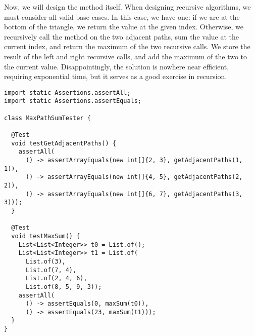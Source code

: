 \begin{figure}[ht!]
  \centering
{}
\end{figure}

Now, we will design the method itself. 
When designing recursive algorithms, we must consider all valid base cases.
In this case, we have one: if we are at the bottom of the triangle, we return the value at the given index.
Otherwise, we recursively call the method on the two adjacent paths, sum the value at the current index, and return the maximum of the two recursive calls.
We store the result of the left and right recursive calls, and add the maximum of the two to the current value.
Disappointingly, the solution is nowhere near efficient, requiring exponential time, but it serves as a good exercise in recursion.

\begin{lstlisting}[language=MyJava]
import static Assertions.assertAll;
import static Assertions.assertEquals;

class MaxPathSumTester {

  @Test
  void testGetAdjacentPaths() {
    assertAll(
      () -> assertArrayEquals(new int[]{2, 3}, getAdjacentPaths(1, 1)),
      () -> assertArrayEquals(new int[]{4, 5}, getAdjacentPaths(2, 2)),
      () -> assertArrayEquals(new int[]{6, 7}, getAdjacentPaths(3, 3)));
  }

  @Test
  void testMaxSum() {
    List<List<Integer>> t0 = List.of();
    List<List<Integer>> t1 = List.of(
      List.of(3),
      List.of(7, 4),
      List.of(2, 4, 6),
      List.of(8, 5, 9, 3));
    assertAll(
      () -> assertEquals(0, maxSum(t0)),
      () -> assertEquals(23, maxSum(t1)));
  }
}
\end{lstlisting}


